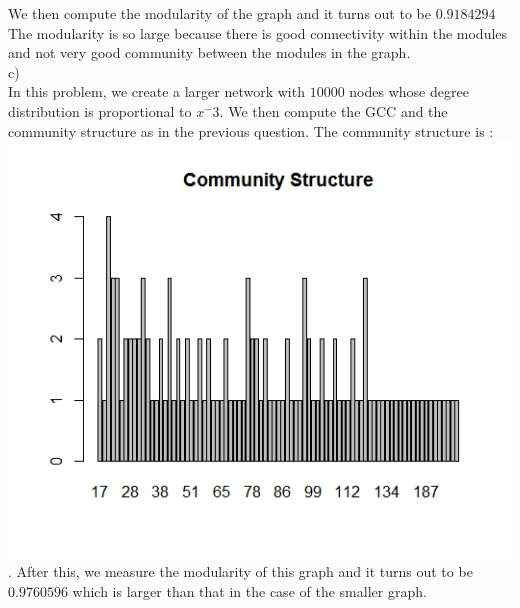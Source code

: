 \documentclass{article}
\begin{document}
We then compute the modularity of the graph and it turns out to be $0.9184294$\\
The modularity is so large because there is good connectivity within the modules and not very good community 
between the modules in the graph.\\

c)\\
In this problem, we create a larger network with $10000$ nodes whose degree distribution is proportional to $x^-3$.
We then compute the GCC and the community structure as in the previous question. The community structure is :\\
\includegraphics[scale=0.4]{pb5}\\.
After this, we measure the modularity of this graph and it turns out to be $0.9760596$ which is larger than that
in the case of the smaller graph.\\
\end{document}
